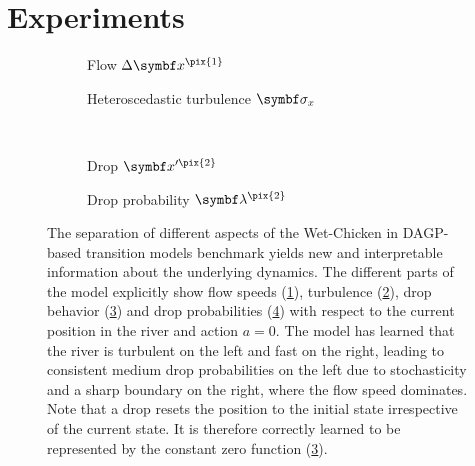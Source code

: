 \section{Experiments}
\label{toc:interpretable_rl:results}
\begin{figure}[tp]
    \centering
    \begin{subfigure}[b]{\halffigurewidth}
        \centering
        
        \caption{
        \label{fig:interpretable_rl:wetchicken:speed}
        Flow $\Delta\mat{x}^{\pix{1}}$
        }
    \end{subfigure}
    \hfill
    \begin{subfigure}[b]{\halffigurewidth}
        \centering
        
        \caption{
            \label{fig:interpretable_rl:wetchicken:hetero}
            Heteroscedastic turbulence $\mat{\sigma}_x$
        }
    \end{subfigure}\\[\figureskip]
    \begin{subfigure}[b]{\halffigurewidth}
        \centering
        
        \caption{
        \label{fig:interpretable_rl:wetchicken:drop}
        Drop $\mat{x}^{\prime\pix{2}}$
        }
    \end{subfigure}
    \hfill
    \begin{subfigure}[b]{\halffigurewidth}
        \centering
        
        \caption{
        \label{fig:interpretable_rl:wetchicken:falldown}
        Drop probability $\mat{\lambda}^{\pix{2}}$
        }
    \end{subfigure}
    \caption[Wet-chicken dynamics separation]{
        \label{fig:interpretable_rl:wetchicken:dynamics}
        The separation of different aspects of the Wet-Chicken in DAGP-based transition models benchmark yields new and interpretable information about the underlying dynamics.
        The different parts of the model explicitly show flow speeds (\cref{fig:interpretable_rl:wetchicken:speed}), turbulence (\cref{fig:interpretable_rl:wetchicken:hetero}), drop behavior (\cref{fig:interpretable_rl:wetchicken:drop}) and drop probabilities (\cref{fig:interpretable_rl:wetchicken:falldown}) with respect to the current position in the river and action $a = 0$.
        The model has learned that the river is turbulent on the left and fast on the right, leading to consistent medium drop probabilities on the left due to stochasticity and a sharp boundary on the right, where the flow speed dominates.
        Note that a drop resets the position to the initial state irrespective of the current state.
        It is therefore correctly learned to be represented by the constant zero function (\cref{fig:interpretable_rl:wetchicken:drop}).
    }
\end{figure}
